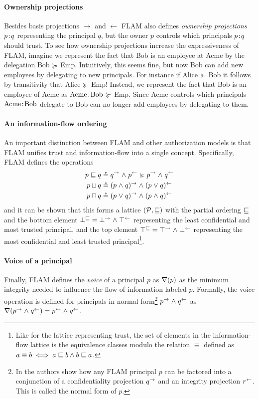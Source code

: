 \paragraph{Ownership projections}
Besides basis projections $\rightarrow$ and $\leftarrow$ FLAM also defines \emph{ownership projections} $p\!:\!q$ representing the principal $q$, but the owner $p$ controls which principals $p\!:\!q$ should trust. To see how ownership projections increase the expressiveness of FLAM, imagine we represent the fact that Bob is an employee at Acme by the delegation Bob $\succcurlyeq$ Emp. Intuitively, this seems fine, but now Bob can add new employees by delegating to new principals. For instance if Alice $\succcurlyeq$ Bob it follows by transitivity that Alice $\succcurlyeq$ Emp! Instead, we represent the fact that Bob is an employee of Acme as $\text{Acme}\!:\!\text{Bob}$ $\succcurlyeq$ Emp. Since Acme controls which principals $\text{Acme}\!:\!\text{Bob}$ delegate to Bob can no longer add employees by delegating to them.

\paragraph{An information-flow ordering}
An important distinction between FLAM and other authorization models is that FLAM unifies trust and information-flow into a single concept. Specifically, FLAM defines the operations
\begin{align*}
p \sqsubseteq q &\circeq q^{\rightarrow} \mathrel{\land} p^{\leftarrow} \succcurlyeq p^{\rightarrow} \mathrel{\land} q^{\leftarrow}\\
p \sqcup q &\circeq (p \mathrel{\land} q)^{\rightarrow} \mathrel{\land} (p \mathrel{\lor} q)^{\leftarrow} \\
p \sqcap q &\circeq (p \mathrel{\lor} q)^{\rightarrow} \mathrel{\land} (p \mathrel{\land} q)^{\leftarrow}
\end{align*}
and it can be shown that this forms a lattice $(\mathcal{P}, \sqsubseteq)$ with the partial ordering $\sqsubseteq$ and the bottom element $\bot^{\sqsubseteq} = \bot^{\rightarrow} \mathrel{\land} \top^{\leftarrow}$ representing the least confidential and most trusted principal, and the top element $\top^{\sqsubseteq} = \top^{\rightarrow} \mathrel{\land} \bot^{\leftarrow}$ representing the most confidential and least trusted principal\footnote{Like for the lattice representing trust, the set of elements in the information-flow lattice is the equivalence classes modulo the relation $\equiv$ defined as $a \equiv b \iff a \sqsubseteq b \wedge b \sqsubseteq a$.}.

\paragraph{Voice of a principal}
Finally, FLAM defines the \emph{voice} of a principal $p$ as $\nabla(p)$ as the minimum integrity needed to influence the flow of information labeled $p$. Formally, the voice operation is defined for principals in normal form\footnote{In \cite{Arden:2015:FA:2859845.2859998} the authors show how any FLAM principal $p$ can be factored into a conjunction of a confidentiality projection $q^{\rightarrow}$ and an integrity projection $r^{\leftarrow}$. This is called the normal form of $p$.} $p^{\rightarrow} \mathrel{\land} q^{\leftarrow}$ as $\nabla(p^{\rightarrow} \mathrel{\land} q^{\leftarrow}) = p^{\leftarrow} \mathrel{\land} q^{\leftarrow}$.

